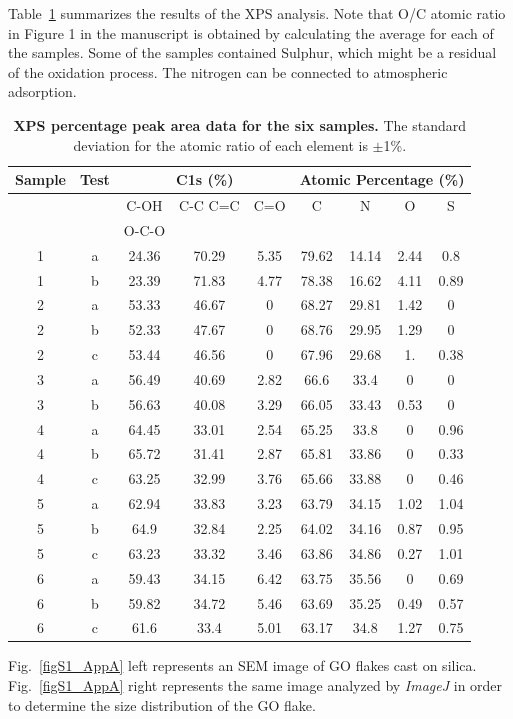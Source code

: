 \justifying
Table~\ref{tblS1_AppA} summarizes the results of the XPS analysis. Note that O/C atomic ratio in Figure 1 in the manuscript is obtained by calculating the average for each of the samples. Some of the samples contained Sulphur, which might be a residual of the oxidation process. The nitrogen can be connected to atmospheric adsorption.


\begin{table}[t!]
 \begin{center}
 \caption{\textbf{XPS percentage peak area data for the six samples.} The standard deviation for the atomic ratio of each element is $\pm$1\%.}
  \label{tblS1_AppA}
  \begin{tabular}{*9c}
  \toprule
  Sample & Test & \multicolumn{3}{c}{C1s (\%)} & \multicolumn{4}{c}{Atomic Percentage (\%)}\\
  \midrule
    {}&{}  & C-OH & C-C C=C & C=O & C & N & O & S\\
    & & O-C-O &  & &  & & &\\
    \hline
    1& a &24.36&	70.29&	5.35&	79.62&	14.14&	2.44&	0.8\\
    1 &b	&23.39&	71.83&	4.77&	78.38&	16.62&	4.11&	0.89\\
    2& a	&53.33&	46.67&	0&	68.27&	29.81&	1.42&	0\\
    2& b	&52.33&	47.67&	0&	68.76&	29.95&	1.29&	0\\
    2 &c	&53.44&	46.56&	0&	67.96&	29.68&	1.&	0.38\\
    3 &a	&56.49&	40.69&	2.82&	66.6&	33.4&	0&	0\\
    3 &b	&56.63&	40.08&	3.29&	66.05&	33.43&	0.53&	0\\
    4& a	&64.45&	33.01&	2.54&	65.25&	33.8&	0&	0.96\\
    4 &b	&65.72&	31.41&	2.87&	65.81&	33.86&	0&	0.33\\
    4 &c	&63.25&	32.99&	3.76&	65.66&	33.88&	0&	0.46\\
    5 &a	&62.94&	33.83&	3.23&	63.79&	34.15&	1.02&	1.04\\
    5 &b &64.9&	32.84&	2.25&	64.02&	34.16&	0.87&	0.95\\
    5 &c	&63.23&	33.32&	3.46&	63.86&	34.86&	0.27&	1.01\\
    6& a	&59.43&	34.15&	6.42&	63.75&	35.56&	0&	0.69\\
    6& b	&59.82&	34.72&	5.46&	63.69&	35.25&	0.49&	0.57\\
    6&c	&61.6&	33.4&	5.01&	63.17&	34.8&	1.27&	0.75\\ \hline
  \end{tabular}
 \end{center}
\end{table}
Fig.~\ref{figS1_AppA} left represents an SEM image of GO flakes cast on silica. Fig.~\ref{figS1_AppA} right represents the same image analyzed by \textit{ImageJ} in order to determine the size distribution of the GO flake. 

